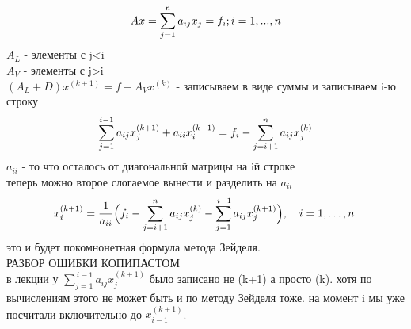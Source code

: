 \documentclass[12pt]{article}
\begin{document}
\begin{equation*}
 Ax = \sum_{j=1}^{n} a_{ij} x_{j} = f_i; i = 1, ..., n \\
\end{equation*}
$A_L$ - элементы с j<i \\
$A_V$ - элементы с j>i \\
$ (A_L+D)x^{(k+1)} = f-A_Vx^{(k)} $  - записываем в виде суммы и записываем i-ю строку\\

\begin{equation*}
\sum_{j=1}^{i-1} a_{ij} x_{j}^{(k+1)} + a_{ii}x_i^{(k+1)} = f_i - \sum_{j=i+1}^{n} a_{ij}x_j^{(k)}\\
\end{equation*}
$  a_{ii} $ - то что осталось от диагональной матрицы на iй строке \\
теперь можно второе слогаемое вынести и разделить на $a_{ii}$ \\
\begin{equation*}
x_{i}^{(k+1)} = \frac{1}{a_{ii}}\Bigl( f_{i} - \sum_{j=i+1}^{n} a_{ij} x_{j}^{(k)} - \sum_{j=1}^{\,i-1} a_{ij} x_{j}^{(k+1)} \Bigr), \quad i = 1,\dots,n.
\end{equation*}
это и будет покомнонетная формула метода Зейделя.\\
РАЗБОР ОШИБКИ КОПИПАСТОМ \\
в лекции у $\sum_{j=1}^{\,i-1} a_{ij} x_{j}^{(k+1)}$ было записано не (k+1) а просто (k). хотя по вычислениям этого не может быть и по методу Зейделя тоже. на момент i мы уже посчитали включительно до $x_{i-1}^{(k+1)}$. 
\end{document}
